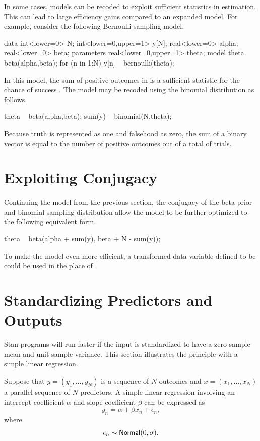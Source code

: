 In some cases, models can be recoded to exploit sufficient statistics
in estimation.  This can lead to large efficiency gains compared to an
expanded model.  For example, consider the following Bernoulli
sampling model.
%
\begin{stancode}
data {
  int<lower=0> N;
  int<lower=0,upper=1> y[N];
  real<lower=0> alpha;
  real<lower=0> beta;
}
parameters {
  real<lower=0,upper=1> theta;
}
model {
  theta ~ beta(alpha,beta);
  for (n in 1:N) 
    y[n] ~ bernoulli(theta);
}
\end{stancode}
%
In this model, the sum of positive outcomes in  is a
sufficient statistic for the chance of success .  The
model may be recoded using the binomial distribution as follows.
%
\begin{stancode}
    theta ~ beta(alpha,beta);
    sum(y) ~ binomial(N,theta);
\end{stancode}
%
Because truth is represented as one and falsehood as zero, the sum
 of a binary vector  is equal to the number of
positive outcomes out of a total of  trials.  



\section{Exploiting Conjugacy}


Continuing the model from the previous section, the conjugacy of the
beta prior and binomial sampling distribution allow the model to be
further optimized to the following equivalent form.
%
\begin{stancode}
    theta ~ beta(alpha + sum(y), beta + N - sum(y));
\end{stancode}
%
To make the model even more efficient, a transformed data variable
defined to be  could be used in the place of .

\section{Standardizing Predictors and Outputs}

Stan programs will run faster if the input is standardized to have a
zero sample mean and unit sample variance.  This section illustrates
the principle with a simple linear regression.

Suppose that $y = (y_1,\ldots,y_N)$ is a sequence of $N$ outcomes and
$x = (x_1,\ldots,x_N)$ a parallel sequence of $N$ predictors.  A
simple linear regression involving an intercept coefficient $\alpha$
and slope coefficient $\beta$ can be expressed as
\[
y_n = \alpha + \beta x_n + \epsilon_n,
\]
where
\[
\epsilon_n \sim \distro{Normal}(0,\sigma).
\]

